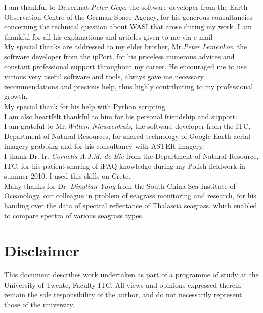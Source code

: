 \documentclass[11pt]{article}
\begin{document}
I am thankful to Dr.rer.nat.\textit{Peter Gege}, the software developer from the Earth Observation Centre of the German Space Agency, for his generous consultancies concerning the technical question about WASI that arose during my work. I am thankful for all his explanations and articles given to me via e-mail \vspace{1mm}\\
My special thanks are addressed to my elder brother, Mr.\textit{Peter Lemenkov}, the software developer from the ipPort, for his priceless numerous advices and constant professional support throughout my career. He encouraged me to use various very useful software and tools, always gave me necessary recommendations and precious help, thus highly contributing to my professional growth. \\ My special thank for his help with Python scripting. \\
I am also heartfelt thankful to him for his personal friendship and support. 
\vspace{1mm}\\
I am grateful to Mr.\textit{Willem Nieuwenhuis}, the software developer from the ITC, Department of Natural Resources, for shared technology of Google Earth aerial imagery grabbing and for his consultancy with ASTER imagery. 
\vspace{1mm}\\
I thank Dr. Ir. \textit{Cornelis A.J.M. de Bie} from the Department of Natural Resource, ITC, for his patient sharing of iPAQ knowledge during my Polish fieldwork in summer 2010. I used this skills on Crete. 
\vspace{1mm}\\
Many thanks for Dr. \textit{Dingtian Yang} from the South China Sea Institute of Oceanology, our colleague in problem of seagrass monitoring and research, for his handing over the data of spectral reflectance of Thalassia seagrass, which enabled to compare spectra of various seagrass types. 

\pagebreak

\section*{Disclaimer}
		This document describes work undertaken as part of a programme of study at the University of
		Twente, Faculty ITC. All views and opinions expressed therein remain the sole responsibility of
		the author, and do not necessarily represent those of the university.\\
\end{document}
